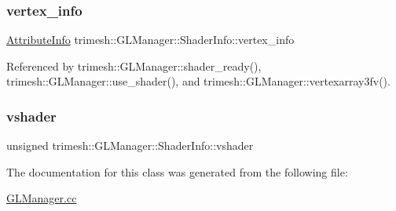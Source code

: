 \subsubsection{\texorpdfstring{vertex\+\_\+info}{vertex\_info}}
{\footnotesize\ttfamily \hyperlink{structtrimesh_1_1GLManager_1_1AttributeInfo}{Attribute\+Info} trimesh\+::\+G\+L\+Manager\+::\+Shader\+Info\+::vertex\+\_\+info}



Referenced by trimesh\+::\+G\+L\+Manager\+::shader\+\_\+ready(), trimesh\+::\+G\+L\+Manager\+::use\+\_\+shader(), and trimesh\+::\+G\+L\+Manager\+::vertexarray3fv().

\mbox{\label{classtrimesh_1_1GLManager_1_1ShaderInfo_adfbd24cd9991b9e186a445173b0ee674}} 
\subsubsection{\texorpdfstring{vshader}{vshader}}
{\footnotesize\ttfamily unsigned trimesh\+::\+G\+L\+Manager\+::\+Shader\+Info\+::vshader}



The documentation for this class was generated from the following file\+:\begin{DoxyCompactItemize}
\item 
\hyperlink{GLManager_8cc}{G\+L\+Manager.\+cc}\end{DoxyCompactItemize}
